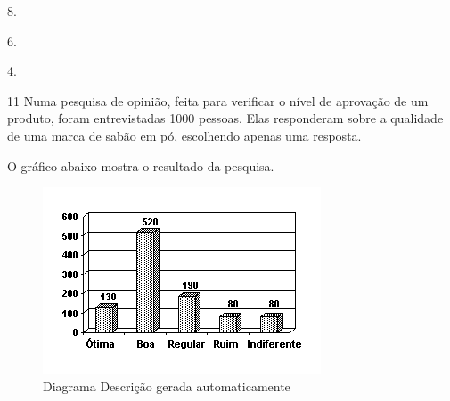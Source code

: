 {{{\begin{escolha}
{{{{\begin{escolha}
\begin{escolha}
{\begin{escolha}
\begin{escolha}
\begin{escolha}
\begin{escolha}
\begin{escolha}
\begin{escolha}
{{\begin{escolha}
  \item 8.

  \item 6.

  \item 4.

\end{escolha}


\num{11} Numa pesquisa de opinião, feita para verificar o nível de aprovação
de um produto, foram entrevistadas 1000 pessoas. Elas responderam sobre a
qualidade de uma marca de sabão em pó, escolhendo apenas uma
resposta.

O gráfico abaixo mostra o resultado da pesquisa.

\begin{figure}
\centering
\includegraphics[width=3.25in,height=2.18333in]{./_SAEB_9_MAT/media/image279.png}
\caption{Diagrama Descrição gerada automaticamente}
\end{figure}

}}
\end{escolha}
\end{escolha}
\end{escolha}
\end{escolha}
\end{escolha}
\end{escolha}}
\end{escolha}
\end{escolha}}}}}
\end{escolha}}}}
